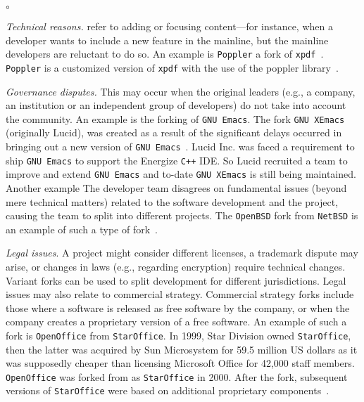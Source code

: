 \begin{list}{$\circ$}{}
   \item \textit{Technical reasons.} refer to adding or focusing content---for instance, when a developer wants to include a new feature in the mainline, but the mainline developers are reluctant to do so. An example is \texttt{Poppler} a fork of \texttt{xpdf}~\cite{Gregorio:2012}. \texttt{Poppler} is a customized version of \texttt{xpdf} with the use of the poppler library~\cite{poppler}.
    
    
    \item \textit{Governance disputes.} This may occur when the original leaders (e.g., a company, an institution or an independent group of developers) do not take into account the community. An example is the forking of \texttt{GNU Emacs}.
    The fork \texttt{GNU XEmacs} (originally Lucid), was created as a result of the significant delays occurred in bringing out a new version of \texttt{GNU Emacs}~\cite{XEmacs}. Lucid Inc. was faced a requirement to ship \texttt{GNU Emacs} to support the Energize \texttt{C++} IDE. So Lucid recruited a team to improve and extend \texttt{GNU Emacs} and to-date \texttt{GNU XEmacs} is still being maintained. Another example The developer team disagrees on fundamental issues (beyond mere technical matters) related to the software development and the project, causing the team to split into different projects. The \texttt{OpenBSD} fork from \texttt{NetBSD} is an example of such a type of fork~\cite{openbsd}.




\item \textit{Legal issues}. A project might consider different licenses, a trademark dispute may arise, or changes in laws (e.g., regarding encryption) require technical changes. Variant forks can be used to split development for different jurisdictions. Legal issues may also relate to commercial strategy. Commercial strategy forks include those where a software is released as free software by the company, or when the company creates a proprietary version of a free software. An example of such a fork is \texttt{OpenOffice} from \texttt{StarOffice}. In 1999, Star Division owned \texttt{StarOffice}, then the latter was acquired by Sun Microsystem for 59.5 million US dollars as it was supposedly cheaper than licensing Microsoft Office for 42,000 staff members. \texttt{OpenOffice} was forked from as \texttt{StarOffice} in 2000. After the fork, subsequent versions of \texttt{StarOffice} were based on additional proprietary components~\cite{Openoffice}.


\end{list}
